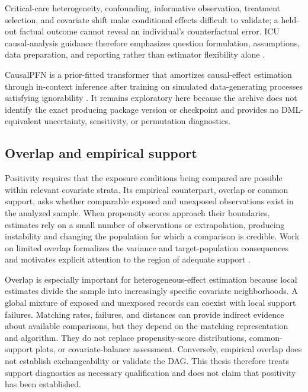 Critical-care heterogeneity, confounding, informative observation, treatment selection, and covariate shift make conditional effects difficult to validate; a held-out factual outcome cannot reveal an individual's counterfactual error.  ICU causal-analysis guidance therefore emphasizes question formulation, assumptions, data preparation, and reporting rather than estimator flexibility alone \cite{smit_2023_causal_inference_icu_scoping_review}.

CausalPFN is a prior-fitted transformer that amortizes causal-effect estimation through in-context inference after training on simulated data-generating processes satisfying ignorability \cite{balazadeh2025causalpfn}.  It remains exploratory here because the archive does not identify the exact producing package version or checkpoint and provides no DML-equivalent uncertainty, sensitivity, or permutation diagnostics.

\subsection{Overlap and empirical support}

Positivity requires that the exposure conditions being compared are possible within relevant covariate strata.  Its empirical counterpart, overlap or common support, asks whether comparable exposed and unexposed observations exist in the analyzed sample.  When propensity scores approach their boundaries, estimates rely on a small number of observations or extrapolation, producing instability and changing the population for which a comparison is credible.  Work on limited overlap formalizes the variance and target-population consequences and motivates explicit attention to the region of adequate support \cite{crump_et_al_2009_limited_overlap}.

Overlap is especially important for heterogeneous-effect estimation because local estimates divide the sample into increasingly specific covariate neighborhoods.  A global mixture of exposed and unexposed records can coexist with local support failures.  Matching rates, failures, and distances can provide indirect evidence about available comparisons, but they depend on the matching representation and algorithm.  They do not replace propensity-score distributions, common-support plots, or covariate-balance assessment.  Conversely, empirical overlap does not establish exchangeability or validate the DAG.  This thesis therefore treats support diagnostics as necessary qualification and does not claim that positivity has been established.

